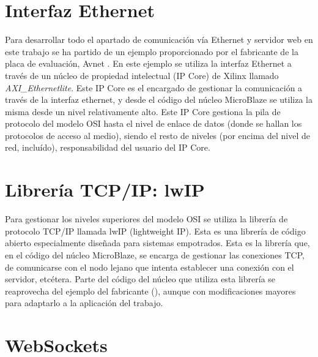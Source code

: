 \documentclass[conference,compsoc]{IEEEtran}
\begin{document}
	\section{Interfaz Ethernet}

		Para desarrollar todo el apartado de comunicaci\'on v\'ia Ethernet y servidor web en este
		trabajo se ha partido de un ejemplo proporcionado por el fabricante de la placa de evaluaci\'on,
		Avnet \cite{bib:lwip-example}. En este ejemplo se utiliza la interfaz Ethernet a trav\'es de un
		n\'ucleo de propiedad intelectual (IP Core) de Xilinx llamado \emph{AXI\_Ethernetlite}. Este IP
		Core es el encargado de gestionar la comunicaci\'on a trav\'es de la interfaz ethernet, y desde
		el c\'odigo del n\'ucleo MicroBlaze se utiliza la misma desde un nivel relativamente alto. Este
		IP Core gestiona la pila de protocolo del modelo OSI hasta el nivel de enlace de datos (donde se
		hallan los protocolos de acceso al medio), siendo el resto de niveles (por encima del nivel de
		red, inclu\'ido), responsabilidad del usuario del IP Core.

	\section{Librer\'ia TCP/IP: lwIP}

		Para gestionar los niveles superiores del modelo OSI se utiliza la librer\'ia de protocolo
		TCP/IP llamada lwIP (lightweight IP). Esta es una librer\'ia de c\'odigo abierto
		especialmente dise\~nada para sistemas empotrados. Esta es la librer\'ia que, en el c\'odigo
		del n\'ucleo MicroBlaze, se encarga de gestionar las conexiones TCP, de comunicarse con el
		nodo lejano que intenta establecer una conexi\'on con el servidor, etc\'etera. Parte del
		c\'odigo del n\'ucleo que utiliza esta librer\'ia se reaprovecha del ejemplo del fabricante
		(\cite{bib:lwip-example}), aunque con modificaciones mayores para adaptarlo a la
		aplicaci\'on del trabajo.

	\section{WebSockets}
\end{document}
